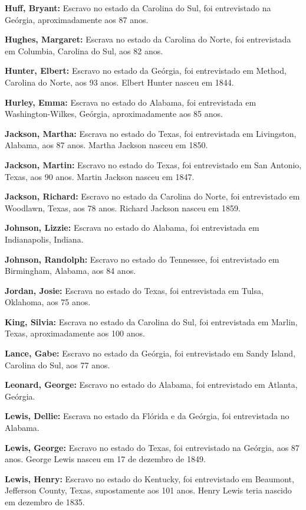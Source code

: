 \textbf{Huff, Bryant:} Escravo no estado da Carolina do Sul, foi
entrevistado na Geórgia, aproximadamente aos 87 anos.

\textbf{Hughes, Margaret:} Escrava no estado da Carolina do Norte, foi
entrevistada em Columbia, Carolina do Sul, aos 82 anos.

\textbf{Hunter, Elbert:} Escravo no estado da Geórgia, foi entrevistado
em Method, Carolina do Norte, aos 93 anos. Elbert Hunter nasceu em 1844.

\textbf{Hurley, Emma:} Escrava no estado do Alabama, foi entrevistada em
Washington-Wilkes, Geórgia, aproximadamente aos 85 anos.

\textbf{Jackson, Martha:} Escrava no estado do Texas, foi entrevistada
em Livingston, Alabama, aos 87 anos. Martha Jackson nasceu em 1850.

\textbf{Jackson, Martin:} Escravo no estado do Texas, foi entrevistado
em San Antonio, Texas, aos 90 anos. Martin Jackson nasceu em 1847.

\textbf{Jackson, Richard:} Escravo no estado da Carolina do Norte, foi
entrevistado em Woodlawn, Texas, aos 78 anos. Richard Jackson nasceu em
1859.

\textbf{Johnson, Lizzie:} Escrava no estado do Alabama, foi entrevistada
em Indianapolis, Indiana.

\textbf{Johnson, Randolph:} Escravo no estado do Tennessee, foi
entrevistado em Birmingham, Alabama, aos 84 anos.

\textbf{Jordan, Josie:} Escrava no estado do Texas, foi entrevistada em
Tulsa, Oklahoma, aos 75 anos.

\textbf{King, Silvia:} Escrava no estado da Carolina do Sul, foi
entrevistada em Marlin, Texas, aproximadamente aos 100 anos.

\textbf{Lance, Gabe:} Escravo no estado da Geórgia, foi entrevistado em
Sandy Island, Carolina do Sul, aos 77 anos.

\textbf{Leonard, George:} Escravo no estado do Alabama, foi entrevistado
em Atlanta, Geórgia.

\textbf{Lewis, Dellie:} Escrava no estado da Flórida e da Geórgia, foi
entrevistada no Alabama.

\textbf{Lewis, George:} Escravo no estado do Texas, foi entrevistado na
Geórgia, aos 87 anos. George Lewis nasceu em 17 de dezembro de 1849.

\textbf{Lewis, Henry:} Escravo no estado do Kentucky, foi entrevistado
em Beaumont, Jefferson County, Texas, supostamente aos 101 anos. Henry
Lewis teria nascido em dezembro de 1835.

